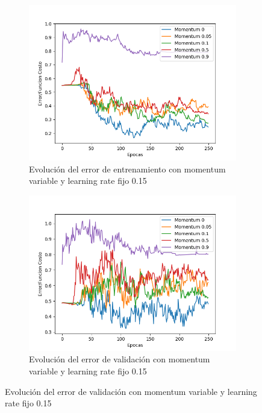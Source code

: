 \begin{figure}[!htbp]
\centering
\begin{subfigure}{.5\textwidth}
  \centering
  \includegraphics[width=1\linewidth]{graficos/eta_x_momentum_promedios_entrenamiento_0_15.png}
  \caption{Evolución del error de entrenamiento con momentum variable y learning rate fijo 0.15}
  \label{fig:sub1}
\end{subfigure}%
\begin{subfigure}{.5\textwidth}
  \centering
  \includegraphics[width=1\linewidth]{graficos/eta_x_momentum_promedios_validacion_0_15.png}
  \caption{Evolución del error de validación con momentum variable y learning rate fijo 0.15}
  \label{fig:sub2}
\end{subfigure}
\end{figure}

